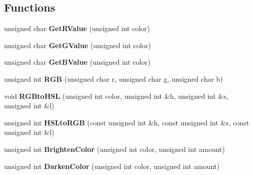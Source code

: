 \subsection*{Functions}
\begin{DoxyCompactItemize}
\item 
\hypertarget{namespacehokusai_a43b1a2bda75e49e6a8dc3465b0ee8a93}{unsigned char {\bfseries Get\+R\+Value} (unsigned int color)}\label{namespacehokusai_a43b1a2bda75e49e6a8dc3465b0ee8a93}

\item 
\hypertarget{namespacehokusai_a73fac232e36a6cec30e054795c3228fb}{unsigned char {\bfseries Get\+G\+Value} (unsigned int color)}\label{namespacehokusai_a73fac232e36a6cec30e054795c3228fb}

\item 
\hypertarget{namespacehokusai_a7cf4cbfc3c17699862352907c5b25a53}{unsigned char {\bfseries Get\+B\+Value} (unsigned int color)}\label{namespacehokusai_a7cf4cbfc3c17699862352907c5b25a53}

\item 
\hypertarget{namespacehokusai_a77d71ac76d830c0bb23d7e99d514eac0}{unsigned int {\bfseries R\+G\+B} (unsigned char r, unsigned char g, unsigned char b)}\label{namespacehokusai_a77d71ac76d830c0bb23d7e99d514eac0}

\item 
\hypertarget{namespacehokusai_a4fdcdbdeabedaa3d8438097966ef3e4d}{void {\bfseries R\+G\+Bto\+H\+S\+L} (unsigned int color, unsigned int \&h, unsigned int \&s, unsigned int \&l)}\label{namespacehokusai_a4fdcdbdeabedaa3d8438097966ef3e4d}

\item 
\hypertarget{namespacehokusai_abd4c5215c322003ac71769ad52d3b951}{unsigned int {\bfseries H\+S\+Lto\+R\+G\+B} (const unsigned int \&h, const unsigned int \&s, const unsigned int \&l)}\label{namespacehokusai_abd4c5215c322003ac71769ad52d3b951}

\item 
\hypertarget{namespacehokusai_aa4cf8df63d140e86c95913b1f6a63ae1}{unsigned int {\bfseries Brighten\+Color} (unsigned int color, unsigned int amount)}\label{namespacehokusai_aa4cf8df63d140e86c95913b1f6a63ae1}

\item 
\hypertarget{namespacehokusai_aa61e91348f8c960e2d971e61efdbc047}{unsigned int {\bfseries Darken\+Color} (unsigned int color, unsigned int amount)}\label{namespacehokusai_aa61e91348f8c960e2d971e61efdbc047}


\end{DoxyCompactItemize}
